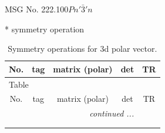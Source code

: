\documentclass[fleqn,8pt]{jsarticle}
\begin{document}
\setcounter{MaxMatrixCols}{32}

\renewcommand{\tablename}{Table~}
\renewcommand{\figurename}{Figure~}
\begin{center}
\LARGE
MSG No. 222.100\quad$Pn'\bar{3}'n$
\end{center}
* symmetry operation
\renewcommand{\arraystretch}{1.3}
\begin{longtable}{ccccc}
\caption{Symmetry operations for 3d polar vector.}
 \\
 \hline \hline
No. & tag & matrix (polar) & det & TR \\ \hline \endfirsthead

\multicolumn{4}{l}{\tablename\ \thetable{}} \\
 \hline \hline
No. & tag & matrix (polar) & det & TR \\ \hline \endhead

 \hline \hline
\multicolumn{4}{r}{\footnotesize\it continued ...} \\ \endfoot

 \hline \hline
\multicolumn{4}{r}{} \\ \endlastfoot


\end{longtable}
\end{document}
